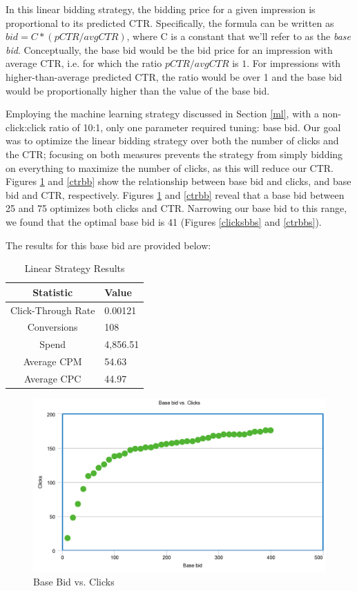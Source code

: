 \documentclass{sig-alternate-05-2015}
\begin{document}
In this linear bidding strategy, the bidding price for a given impression is proportional to its predicted CTR. Specifically, the formula can be written as $bid = C * (pCTR / avg CTR) $, where C is a constant that we'll refer to as the \textit{base bid}. Conceptually, the base bid would be the bid price for an impression with average CTR, i.e. for which the ratio $pCTR / avg CTR$ is $1$. For impressions with higher-than-average predicted CTR, the ratio would be over 1 and the base bid would be proportionally higher than the value of the base bid.

Employing the machine learning strategy discussed in Section \ref{ml}, with a non-click:click ratio of 10:1, only one parameter required tuning: base bid. Our goal was to optimize the linear bidding strategy over both the number of clicks and the CTR; focusing on both measures prevents the strategy from simply bidding on everything to maximize the number of clicks, as this will reduce our CTR. Figures \ref{clicksbb} and \ref{ctrbb} show the relationship between base bid and clicks, and base bid and CTR, respectively. Figures \ref{clicksbb} and \ref{ctrbb} reveal that a base bid between 25 and 75 optimizes both clicks and CTR. Narrowing our base bid to this range, we found that the optimal base bid is 41 (Figures \ref{clicksbbs} and \ref{ctrbbs}).

The results for this base bid are provided below:

\begin{table}[h!]
\centering
\caption{Linear Strategy Results}
\begin{tabular}{|c|l|} \hline
\textbf{Statistic}&\textbf{Value}\\ \hline
Click-Through Rate&0.00121\\ \hline
Conversions&108\\ \hline
Spend&4,856.51\\ \hline
Average CPM&54.63\\ \hline
Average CPC&44.97\\
\hline\end{tabular}
\end{table}

\begin{figure}[h!]
  \includegraphics[width=\linewidth]{linear_clicks.png}
  \caption{Base Bid vs. Clicks}
  \label{clicksbb}
\end{figure}
\end{document}
